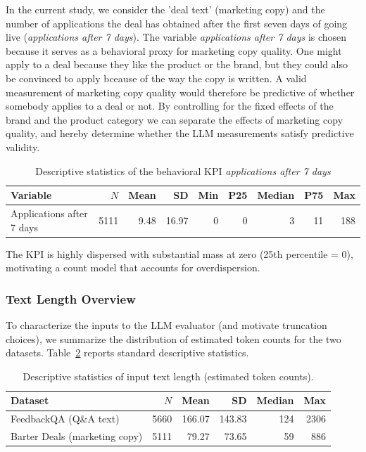 In the current study, we consider the 'deal text' (marketing copy) and the number of applications the deal has obtained after the first seven days of going live (\textit{applications after 7 days}). The variable \textit{applications after 7 days} is chosen because it serves as a behavioral proxy for marketing copy quality. One might apply to a deal because they like the product or the brand, but they could also be convinced to apply bceause of the way the copy is written. A valid measurement of marketing copy quality would therefore be predictive of whether somebody applies to a deal or not. By controlling for the fixed effects of the brand and the product category we can separate the effects of marketing copy quality, and hereby determine whether the LLM measurements satisfy predictive validity. 

\begin{table}[h]
    \centering
    \caption{Descriptive statistics of the behavioral KPI \textit{applications after 7 days}}
    \label{tab:apps7d_stats}
    \begin{tabular}{lrrrrrrrr}
    \toprule
    Variable & $N$ & Mean & SD & Min & P25 & Median & P75 & Max \\
    \midrule
    Applications after 7 days & 5111 & 9.48 & 16.97 & 0 & 0 & 3 & 11 & 188 \\
    \bottomrule
    \end{tabular}
\end{table}

The KPI is highly dispersed with substantial mass at zero (25th percentile = 0), motivating a count model that accounts for overdispersion.


\subsubsection{Text Length Overview}\label{sec:text_length_overview}

To characterize the inputs to the LLM evaluator (and motivate truncation choices), we summarize the distribution of estimated token counts for the two datasets. Table~\ref{tab:token_stats} reports standard descriptive statistics.

\begin{table}[h]
    \centering
    \caption{Descriptive statistics of input text length (estimated token counts).}
    \label{tab:token_stats}
    \begin{tabular}{lrrrrr}
    \toprule
    Dataset & $N$ & Mean & SD & Median & Max \\
    \midrule
    FeedbackQA (Q\&A text) & 5660 & 166.07 & 143.83 & 124 & 2306 \\
    Barter Deals (marketing copy) & 5111 & 79.27 & 73.65 & 59 & 886 \\
    \bottomrule
    \end{tabular}
\end{table}

